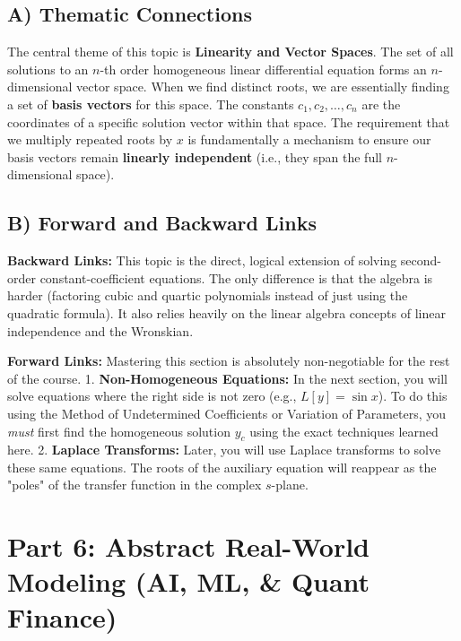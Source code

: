 \documentclass[11pt]{article}
\begin{document}
\subsection{A) Thematic Connections}
The central theme of this topic is \textbf{Linearity and Vector Spaces}. The set of all solutions to an $n$-th order homogeneous linear differential equation forms an $n$-dimensional vector space. 
When we find distinct roots, we are essentially finding a set of \textbf{basis vectors} for this space. The constants $c_1, c_2, \dots, c_n$ are the coordinates of a specific solution vector within that space. The requirement that we multiply repeated roots by $x$ is fundamentally a mechanism to ensure our basis vectors remain \textbf{linearly independent} (i.e., they span the full $n$-dimensional space).

\subsection{B) Forward and Backward Links}
\textbf{Backward Links:} This topic is the direct, logical extension of solving second-order constant-coefficient equations. The only difference is that the algebra is harder (factoring cubic and quartic polynomials instead of just using the quadratic formula). It also relies heavily on the linear algebra concepts of linear independence and the Wronskian.

\textbf{Forward Links:} Mastering this section is absolutely non-negotiable for the rest of the course. 
1. \textbf{Non-Homogeneous Equations:} In the next section, you will solve equations where the right side is not zero (e.g., $L[y] = \sin x$). To do this using the Method of Undetermined Coefficients or Variation of Parameters, you \textit{must} first find the homogeneous solution $y_c$ using the exact techniques learned here.
2. \textbf{Laplace Transforms:} Later, you will use Laplace transforms to solve these same equations. The roots of the auxiliary equation will reappear as the "poles" of the transfer function in the complex $s$-plane.

\newpage
\section{Part 6: Abstract Real-World Modeling (AI, ML, \& Quant Finance)}
\end{document}
